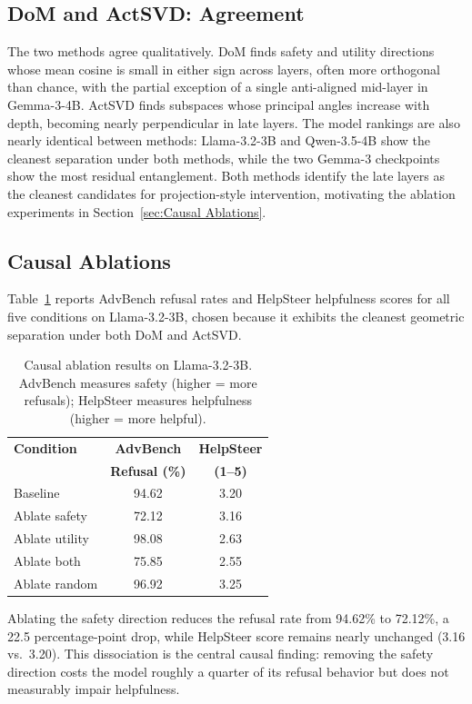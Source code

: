 \subsection{DoM and ActSVD: Agreement}
\label{sec:results-synthesis}
The two methods agree qualitatively. DoM finds safety and utility
directions whose mean cosine is small in either sign across layers,
often more orthogonal than chance, with the partial exception of a
single anti-aligned mid-layer in Gemma-3-4B. ActSVD finds subspaces
whose principal angles increase with depth, becoming nearly
perpendicular in late layers. The model rankings are also nearly
identical between methods: Llama-3.2-3B and Qwen-3.5-4B show the
cleanest separation under both methods, while the two Gemma-3
checkpoints show the most residual entanglement. Both methods
identify the late layers as the cleanest candidates for
projection-style intervention, motivating the ablation experiments
in Section~\ref{sec:Causal Ablations}.


\subsection{Causal Ablations}
\label{sec:results-ablation}

Table~\ref{tab:ablation} reports AdvBench refusal rates and HelpSteer
helpfulness scores for all five conditions on Llama-3.2-3B, chosen
because it exhibits the cleanest geometric separation under both DoM
and ActSVD.

\begin{table}[h]
\centering
\small
\begin{tabular}{lcc}
\hline
\textbf{Condition} & \textbf{AdvBench} & \textbf{HelpSteer} \\
                   & \textbf{Refusal (\%)} & \textbf{(1--5)} \\
\hline
Baseline       & 94.62 & 3.20 \\
Ablate safety  & 72.12 & 3.16 \\
Ablate utility & 98.08 & 2.63 \\
Ablate both    & 75.85 & 2.55 \\
Ablate random  & 96.92 & 3.25 \\
\hline
\end{tabular}
\caption{Causal ablation results on Llama-3.2-3B. AdvBench measures
safety (higher = more refusals); HelpSteer measures helpfulness
(higher = more helpful).}
\label{tab:ablation}
\end{table}

Ablating the safety direction reduces the refusal rate from 94.62\%
to 72.12\%, a 22.5 percentage-point drop, while HelpSteer score
remains nearly unchanged (3.16 vs.\ 3.20). This dissociation is
the central causal finding: removing the safety direction costs the
model roughly a quarter of its refusal behavior but does not
measurably impair helpfulness.

